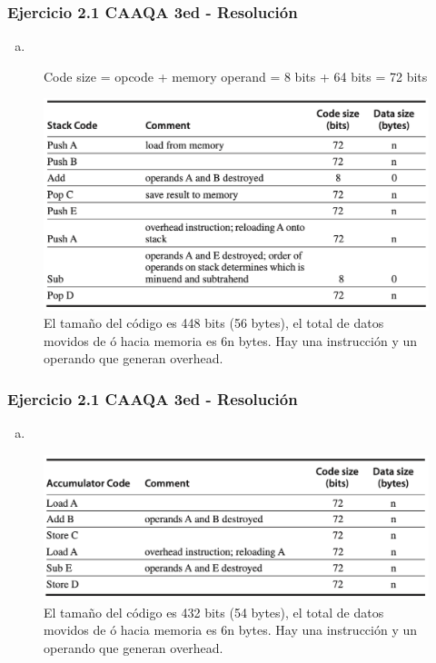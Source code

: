 \documentclass{beamer}
\begin{document}
\begin{frame}
 \frametitle{Ejercicio 2.1 CAAQA 3ed - Resolución}
 \begin{enumerate}[b.]
 \item
\end{enumerate}
\begin{center}

\begin{figure}
\caption*{Code size = opcode + memory  operand = 8 bits + 64 bits = 72 bits}
 \includegraphics[scale=.45,keepaspectratio=true]{Ejercicio21b1.png}
\caption*{El tamaño del código es 448 bits (56 bytes), el total de datos movidos de ó hacia memoria es  6n bytes. Hay una instrucción y un operando que generan overhead.}
\end{figure}

\end{center}
 \end{frame}

\begin{frame}
 \frametitle{Ejercicio 2.1 CAAQA 3ed - Resolución}
 \begin{enumerate}[b.]
 \item
\end{enumerate}
\begin{center}
\begin{figure}
 \includegraphics[scale=.45,keepaspectratio=true]{Ejercicio21b2.png}
\caption*{El tamaño del código es 432 bits (54 bytes), el total de datos movidos de ó hacia memoria es 6n bytes. Hay una instrucción y un operando que generan overhead.}
\end{figure}
\end{center}
 \end{frame}
 
\end{document}
